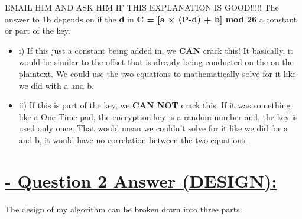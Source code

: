 \documentclass{article}
\begin{document}
EMAIL HIM AND ASK HIM IF THIS EXPLANATION IS GOOD!!!!!
\fi
The answer to 1b depends on if the \textbf{d} in \textbf{C = [a × (P-d) + b] mod 26} a constant or part of the key.
\begin{itemize}
	\item i) If this just a constant being added in, we \textbf{CAN} crack this! It basically, it would be similar to the offset that is already being conducted on the on the plaintext. We could use the two equations to mathematically solve for it like we did with a and b.

	\item ii) If this is part of the key, we \textbf{CAN NOT} crack this. If it was something like a One Time pad, the encryption key is a random number and, the key is used only once. That would mean we couldn't solve for it like we did for a and b, it would have no correlation between the two equations. 
\end{itemize}

\section{\underline{ - Question 2 Answer (DESIGN):}}
The design of my algorithm can be broken down into three parts: 
\end{document}
